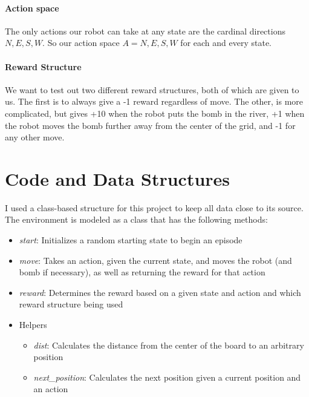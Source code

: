 \documentclass[12pt]{article}
\begin{document}
\paragraph{Action space} The only actions our robot can take at any state are the cardinal directions $N, E, S, W$. So our action space $A = { N, E, S, W }$ for each and every state.

\paragraph{Reward Structure} We want to test out two different reward structures, both of which are given to us. The first is to always give a -1 reward regardless of move. The other, is more complicated, but gives +10 when the robot puts the bomb in the river, +1 when the robot moves the bomb further away from the center of the grid, and -1 for any other move.

\section{Code and Data Structures}
I used a class-based structure for this project to keep all data close to its source. The environment is modeled as a class that has the following methods:
\begin{itemize}
  \item \textit{start}: Initializes a random starting state to begin an episode
  \item \textit{move}: Takes an action, given the current state, and moves the robot (and bomb if necessary), as well as returning the reward for that action
  \item \textit{reward}: Determines the reward based on a given state and action and which reward structure being used
  \item Helpers
        \begin{itemize}
          \item \textit{dist}: Calculates the distance from the center of the board to an arbitrary position
          \item \textit{next\_position}: Calculates the next position given a current position and an action
        \end{itemize}
\end{itemize}
\end{document}
